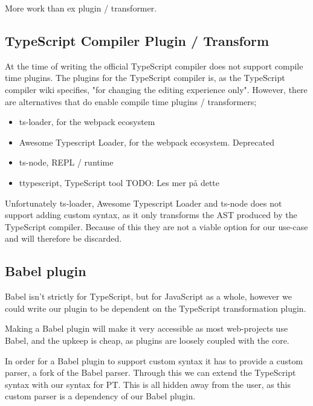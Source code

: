 More work than ex plugin / transformer.

\subsection{TypeScript Compiler Plugin / Transform}\label{subsec:typescript-compiler-plugin}

At the time of writing the official TypeScript compiler does not support compile time plugins.
The plugins for the TypeScript compiler is, as the TypeScript compiler wiki specifies, "for changing the editing experience only"\cite{tscplugin}.
However, there are alternatives that do enable compile time plugins / transformers;

\begin{itemize}
    \item ts-loader\cite{tsloadergithub}, for the webpack ecosystem
    \item Awesome Typescript Loader\cite{awesometypescriptloadergithub}, for the webpack ecosystem. Deprecated
    \item ts-node\cite{tsnodegithub}, REPL / runtime
    \item ttypescript\cite{ttypescriptgithub}, TypeScript tool TODO: Les mer på dette
\end{itemize}

Unfortunately ts-loader, Awesome Typescript Loader and ts-node does not support adding custom syntax, as it only transforms the AST produced by the TypeScript compiler.
Because of this they are not a viable option for our use-case and will therefore be discarded.

\subsection{Babel plugin}\label{subsec:babel-plugin}

Babel isn't strictly for TypeScript, but for JavaScript as a whole, however we could write our plugin to be dependent on the TypeScript transformation plugin.

Making a Babel plugin will make it very accessible as most web-projects use Babel, and the upkeep is cheap, as plugins are loosely coupled with the core.

In order for a Babel plugin to support custom syntax it has to provide a custom parser, a fork of the Babel parser.
Through this we can extend the TypeScript syntax with our syntax for PT.
This is all hidden away from the user, as this custom parser is a dependency of our Babel plugin.

